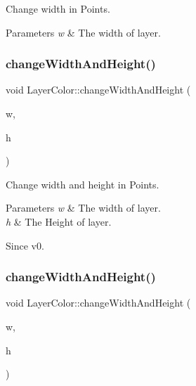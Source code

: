 Change width in Points.


\begin{DoxyParams}{Parameters}
{\em w} & The width of layer. \\
\hline
\end{DoxyParams}
\mbox{\label{classLayerColor_a798a5f19b6961adc375079909943ec84}} 
\subsubsection{\texorpdfstring{change\+Width\+And\+Height()}{changeWidthAndHeight()}\hspace{0.1cm}{\footnotesize\ttfamily [1/2]}}
{\footnotesize\ttfamily void Layer\+Color\+::change\+Width\+And\+Height (\begin{DoxyParamCaption}\item[{G\+Lfloat}]{w,  }\item[{G\+Lfloat}]{h }\end{DoxyParamCaption})}

Change width and height in Points.


\begin{DoxyParams}{Parameters}
{\em w} & The width of layer. \\
\hline
{\em h} & The Height of layer. \\
\hline
\end{DoxyParams}
\begin{DoxySince}{Since}
v0. 
\end{DoxySince}
\mbox{\label{classLayerColor_a798a5f19b6961adc375079909943ec84}} 
\subsubsection{\texorpdfstring{change\+Width\+And\+Height()}{changeWidthAndHeight()}\hspace{0.1cm}{\footnotesize\ttfamily [2/2]}}
{\footnotesize\ttfamily void Layer\+Color\+::change\+Width\+And\+Height (\begin{DoxyParamCaption}\item[{G\+Lfloat}]{w,  }\item[{G\+Lfloat}]{h }\end{DoxyParamCaption})}

